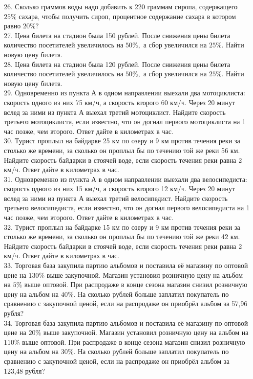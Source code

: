 \documentclass[12pt]{article}
\begin{document}
26. Сколько граммов воды надо добавить к 220 граммам сиропа, содержащего $25\%$ сахара, чтобы получить сироп, процентное содержание сахара в котором равно $20\%?$\\
27. Цена билета на стадион была 150 рублей. После снижения цены билета количество посетителей увеличилось на $50\%,$ а сбор увеличился на $25\%.$ Найти новую цену билета.\\
28. Цена билета на стадион была 120 рублей. После снижения цены билета количество посетителей увеличилось на $50\%,$ а сбор увеличился на $25\%.$ Найти новую цену билета.\\
29. Одновременно из пункта А в одном направлении выехали два мотоциклиста: скорость одного из них 75 км/ч, а скорость второго 60 км/ч. Через 20 минут вслед за ними из пункта А выехал третий мотоциклист. Найдите скорость третьего мотоциклиста, если известно, что он догнал первого мотоциклиста на 1 час позже, чем второго. Ответ дайте в километрах в час.\\
30. Турист проплыл на байдарке 25 км по озеру и 9 км против течения реки за столько же времени, за сколько он проплыл бы по течению той же реки 56 км. Найдите скорость байдарки в стоячей воде, если скорость течения реки равна 2 км/ч. Ответ дайте в километрах в час.\\
31. Одновременно из пункта А в одном направлении выехали два велосипедиста: скорость одного из них 15 км/ч, а скорость второго 12 км/ч. Через 20 минут вслед за ними из пункта А выехал третий велосипедист. Найдите скорость третьего велосипедиста, если известно, что он догнал первого велосипедиста на 1 час позже, чем второго. Ответ дайте в километрах в час.\\
32. Турист проплыл на байдарке 15 км по озеру и 9 км против течения реки за столько же времени, за сколько он проплыл бы по течению той же реки 42 км. Найдите скорость байдарки в стоячей воде, если скорость течения реки равна 2 км/ч. Ответ дайте в километрах в час.\\
33. Торговая база закупила партию альбомов и поставила её магазину по оптовой цене на $130\%$ выше закупочной. Магазин установил розничную цену на альбом на $5\%$ выше оптовой. При распродаже в конце сезона магазин снизил розничную цену на альбом на $40\%.$ На сколько рублей больше заплатил покупатель по сравнению с закупочной ценой, если на распродаже он приобрёл альбом за 57,96 рубля?\\
34. Торговая база закупила партию альбомов и поставила её магазину по оптовой цене на $20\%$ выше закупочной. Магазин установил розничную цену на альбом на $110\%$ выше оптовой. При распродаже в конце сезона магазин снизил розничную цену на альбом на $30\%.$ На сколько рублей больше заплатил покупатель по сравнению с закупочной ценой, если на распродаже он приобрёл альбом за 123,48 рубля?\\
\end{document}
